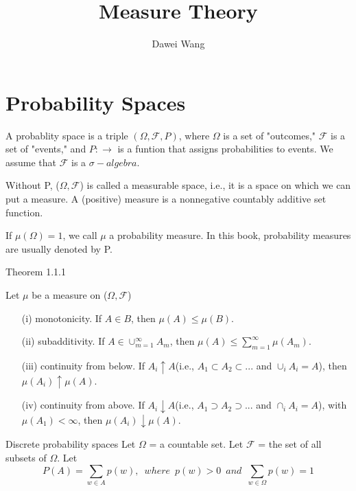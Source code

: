 \documentclass{article}
\author{Dawei Wang}
\title{Measure Theory}
\begin{document}
\maketitle

\section*{Probability Spaces}

A probablity space is a triple $(\Omega,\mathcal{F},P)$, where $\Omega$ is a set of "outcomes," $\mathcal{F}$ is a set of "events," and $P:\mathcal \rightarrow$ is a funtion that assigns probabilities to events. We assume that $\mathcal{F}$ is a $\sigma-algebra$.

Without P, ($\Omega,\mathcal{F}$) is called a measurable space, i.e., it is a space on which we can put
a measure. A (positive) measure is a nonnegative countably additive set function.

If $\mu(\Omega)=1$, we call $\mu$ a probability measure. In this book, probability measures are usually denoted by P.

\begin{theo}{Theorem 1.1.1}

Let $\mu$ be a measure on ($\Omega,\mathcal{F}$)

\begin{enumerate}
  \item [(i)] monotonicity. If $A\in B$, then $\mu(A)\le \mu(B)$.
  \item [(ii)] subadditivity. If $A\in \cup_{m=1}^\infty A_m$, then $\mu(A)\le \sum^\infty_{m=1}\mu(A_m)$.
  \item [(iii)] continuity from below. If $A_i\uparrow A$(i.e., $A_1\subset A_2\subset ...$ and $\cup_i A_i=A$), then $\mu(A_i)\uparrow\mu(A)$.
  \item [(iv)] continuity from above. If $A_i\downarrow A$(i.e., $A_1\supset A_2\supset ...$ and $\cap_i A_i=A$), with $\mu(A_1)<\infty$, then $\mu(A_i)\downarrow\mu(A)$.
\end{enumerate}
	
\end{theo}

\begin{example}{Discrete probability spaces}
Let $\Omega$ = a countable set. Let $\mathcal{F}$ = the set of all subsets of $\Omega$. Let	
\begin{displaymath}
  P(A)=\sum_{w\in A}p(w),\enspace where\enspace p(w)>0\enspace and\enspace\sum_{w\in\Omega}p(w)=1
\end{displaymath}

\end{example}
\end{document}
